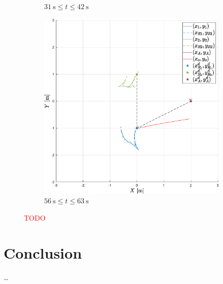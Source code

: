 \documentclass{ifacconf}
\begin{document}
\begin{figure}
\begin{subfigure}[b]{0.32\columnwidth}
         \caption{$\SI{31}{\second} \leq  t \leq \SI{42}{\second}$}
    \end{subfigure}
    \begin{subfigure}[b]{0.32\columnwidth}
        \centering
        \includegraphics[width=\linewidth]{images/experiment/dynamic_obstacles/dynamicObst_exp_closeR1.eps}
        \caption{$\SI{56}{\second} \leq  t \leq \SI{63}{\second}$}
    \end{subfigure}
    \vspace{-0.2cm}
    \caption{\textcolor{red}{TODO}}
\end{figure}

\section{Conclusion}
\label{sec:conclusion}

\dots

\end{document}
